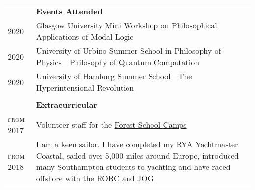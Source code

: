 \documentclass{article}
\renewcommand{\section}[1]{\\[-1.0ex]& \multicolumn{2}{l}{\bfseries{\Large{#1}}}\vspace{0.5ex}\\}
\newcommand{\entry}[3]{\scriptsize{\textsc{#1}} & #2 & #3 \\}
\begin{document}
\begin{tabularx}{\textwidth}{ p{6em} X p{6em} }
\section{Events Attended}
\entry{2020}{Glasgow University Mini Workshop on Philosophical Applications of Modal Logic}{}
\entry{2020}{University of Urbino Summer School in Philosophy of Physics---Philosophy of \mbox{Quantum} Computation}{}
\entry{2020}{University of Hamburg Summer School---The Hyperintensional Revolution}{}

\section{Extracurricular}
\entry{from 2017}{Volunteer staff for the \href{https://www.fsc.org.uk/}{Forest School Camps}}{}
\entry{from 2018}{I am a keen sailor. I have completed my RYA Yachtmaster Coastal, sailed over 5,000 miles around Europe, introduced many Southampton students to yachting and have raced offshore with the \href{https://www.rorc.org}{RORC} and \href{https://jog.org.uk}{JOG}}{}

\end{tabularx}
\end{document}
